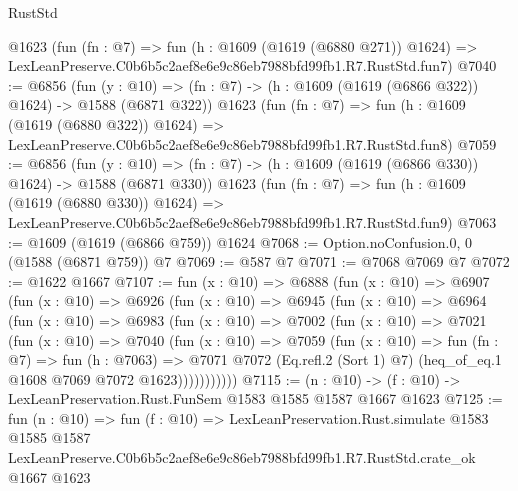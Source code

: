 \begin{lexlean}{RustStd}
\begin{coremodule}
    @1623
    (fun (fn : @7) =>
    fun (h : @1609 (@1619 (@6880 @271)) @1624) =>
    LexLeanPreserve.C0b6b5c2aef8e6e9c86eb7988bfd99fb1.R7.RustStd.fun7)
@7040 := @6856
    (fun (y : @10) => (fn : @7) -> (h : @1609 (@1619 (@6866 @322)) @1624) -> @1588 (@6871 @322))
    @1623
    (fun (fn : @7) =>
    fun (h : @1609 (@1619 (@6880 @322)) @1624) =>
    LexLeanPreserve.C0b6b5c2aef8e6e9c86eb7988bfd99fb1.R7.RustStd.fun8)
@7059 := @6856
    (fun (y : @10) => (fn : @7) -> (h : @1609 (@1619 (@6866 @330)) @1624) -> @1588 (@6871 @330))
    @1623
    (fun (fn : @7) =>
    fun (h : @1609 (@1619 (@6880 @330)) @1624) =>
    LexLeanPreserve.C0b6b5c2aef8e6e9c86eb7988bfd99fb1.R7.RustStd.fun9)
@7063 := @1609 (@1619 (@6866 @759)) @1624
@7068 := Option.noConfusion.{0, 0} (@1588 (@6871 @759)) @7
@7069 := @587 @7
@7071 := @7068 @7069 @7
@7072 := @1622 @1667
@7107 := fun (x : @10) =>
  @6888
    (fun (x : @10) =>
    @6907
      (fun (x : @10) =>
      @6926
        (fun (x : @10) =>
        @6945
          (fun (x : @10) =>
          @6964
            (fun (x : @10) =>
            @6983
              (fun (x : @10) =>
              @7002
                (fun (x : @10) =>
                @7021
                  (fun (x : @10) =>
                  @7040
                    (fun (x : @10) =>
                    @7059
                      (fun (x : @10) =>
                      fun (fn : @7) =>
                      fun (h : @7063) =>
                      @7071
                        @7072
                        (Eq.refl.{2} (Sort 1) @7)
                        (heq_of_eq.{1} @1608 @7069 @7072 @1623)))))))))))
@7115 := (n : @10) -> (f : @10) -> LexLeanPreservation.Rust.FunSem @1583 @1585 @1587 @1667 @1623
@7125 := fun (n : @10) =>
  fun (f : @10) =>
  LexLeanPreservation.Rust.simulate
    @1583
    @1585
    @1587
    LexLeanPreserve.C0b6b5c2aef8e6e9c86eb7988bfd99fb1.R7.RustStd.crate_ok
    @1667
    @1623
\end{coremodule}
\end{lexlean}
